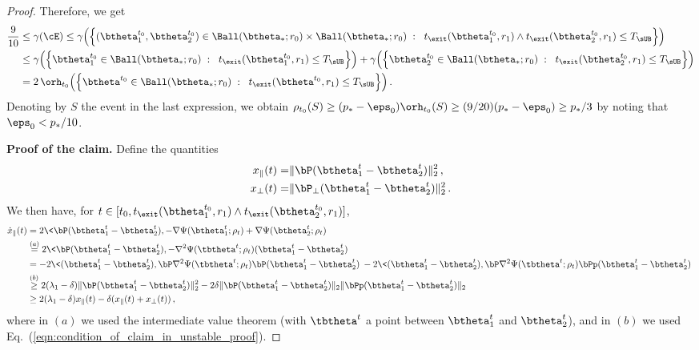 \documentclass[11pt]{article}
\begin{document}
\begin{proof}
Therefore, we get
\begin{align*}
\frac{9}{10}& \le \gamma(\cE) \le \gamma\Big(\Big\{(\btheta_1^{t_0},\btheta_2^{t_0})\in\Ball(\btheta_*;r_0)\times \Ball(\btheta_*;r_0)
\; :\;\; t_{\exit}(\btheta^{t_0}_1,r_1)\wedge t_{\exit}(\btheta^{t_0}_2,r_1)\le T_{\sUB}\Big\}\Big)\\
& \le \gamma\Big(\Big\{\btheta_1^{t_0}\in\Ball(\btheta_*;r_0)\; :\;\; t_{\exit}(\btheta^{t_0}_1,r_1)\le T_{\sUB}\Big\}\Big)+
\gamma\Big(\Big\{\btheta_2^{t_0}\in\Ball(\btheta_*;r_0)\; :\;\; t_{\exit}(\btheta^{t_0}_2,r_1)\le T_{\sUB}\Big\}\Big)\\
& = 2\, \orh_{t_0}\Big(\Big\{\btheta^{t_0}\in\Ball(\btheta_*;r_0)\; :\;\; t_{\exit}(\btheta^{t_0},r_1)\le T_{\sUB}\Big\}\Big)\, .
\end{align*}
Denoting by $S$ the event in the last expression, we obtain $\rho_{t_0}(S)\ge (p_*-\eps_0)\orh_{t_0}(S)\ge (9/20)(p_*-\eps_0)\ge p_*/3$ by noting that $\eps_0 < p_* / 10$. 

\noindent
{\bf Proof of the claim. }
Define the quantities
%
\begin{align}
%
x_{\parallel}(t) =& \|\bP(\btheta_1^t-\btheta^t_2)\|_2^2\, ,\\
x_{\perp}(t) =& \|\bP_{\perp}(\btheta_1^t-\btheta^t_2)\|_2^2\,.
%
\end{align}
%
We then have, for $t \in  [t_0, t_{\exit}(\btheta^{t_0}_1,r_1)\wedge t_{\exit}(\btheta^{t_0}_2,r_1)]$,
%
\begin{align*}
%
\dot{x}_{\parallel}(t)& = 2\<\bP(\btheta_1^t-\btheta_2^t), -\nabla\Psi(\btheta_1^t;\rho_t) +\nabla\Psi(\btheta_2^t;\rho_t)\>\\
& \stackrel{(a)}{=} 2\<\bP(\btheta_1^t-\btheta_2^t), -\nabla^2\Psi(\tbtheta^t;\rho_t)(\btheta_1^t-\btheta^t_2)\>\\
& = - 2\<(\btheta_1^t-\btheta_2^t), \bP\nabla^2\Psi(\tbtheta^t;\rho_t) \bP(\btheta_1^t-\btheta^t_2)\> -
2\<(\btheta_1^t-\btheta_2^t), \bP \nabla^2\Psi(\tbtheta^t;\rho_t) \bPp(\btheta_1^t-\btheta^t_2)\>\\
&\stackrel{(b)}{\ge} 2(\lambda_1-\delta) \| \bP(\btheta_1^t-\btheta^t_2)\|_2^2-2\delta \|\bP(\btheta_1^t-\btheta^t_2)\|_2 \|\bPp(\btheta_1^t-\btheta^t_2)\|_2\\
&\ge 2(\lambda_1-\delta) x_{\parallel}(t) -\delta(x_{\parallel}(t)+x_{\perp}(t))\, ,
%
\end{align*}
%
where in $(a)$ we used the intermediate value theorem (with $\tbtheta^t$ a point between $\btheta_1^t$ and $\btheta_2^t$),
and in $(b)$ we used Eq.~(\ref{eqn:condition_of_claim_in_unstable_proof}).


\end{proof}
\end{document}
